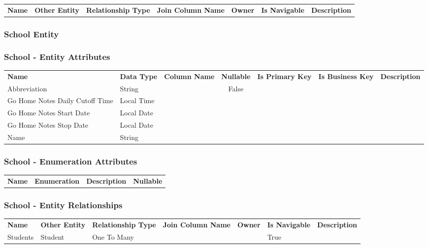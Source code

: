 \begin{tabular}{llllllp{2.0cm}}
\bfseries Name & \bfseries Other Entity & \bfseries Relationship Type & \bfseries Join Column Name & \bfseries Owner & \bfseries Is Navigable & \bfseries Description\\
\end{tabular}


\subsubsection{ School Entity }

\subsubsection*{ School - Entity Attributes }

\begin{tabular}{lllcccl}
\bfseries Name & \bfseries Data Type & \bfseries Column Name & \bfseries Nullable & \bfseries Is Primary Key & \bfseries Is Business Key & \bfseries Description\\
Abbreviation & String &  & False &  &  &  \\
Go Home Notes Daily Cutoff Time & Local Time &  &  &  &  &  \\
Go Home Notes Start Date & Local Date &  &  &  &  &  \\
Go Home Notes Stop Date & Local Date &  &  &  &  &  \\
Name & String &  &  &  &  &  \\
\end{tabular}

\subsubsection*{ School - Enumeration Attributes}

\begin{tabular}{lcp{6.0cm}c}
\bfseries Name & \bfseries Enumeration & \bfseries Description & \bfseries Nullable \\
\end{tabular}

\subsubsection*{ School - Entity Relationships}

\begin{tabular}{llllllp{2.0cm}}
\bfseries Name & \bfseries Other Entity & \bfseries Relationship Type & \bfseries Join Column Name & \bfseries Owner & \bfseries Is Navigable & \bfseries Description\\
Students & Student & One To Many &  &  & True & \\
\end{tabular}


